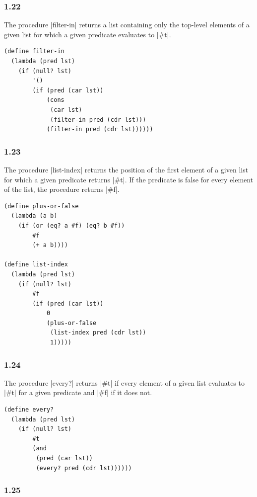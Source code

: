 \documentclass[a4paper]{article}
\begin{document}
\subsubsection*{1.22}

The procedure |filter-in| returns a list containing only the top-level elements of a given list for which a given predicate evaluates to |#t|.

\begin{lstlisting}
(define filter-in
  (lambda (pred lst)
    (if (null? lst)
        '()
        (if (pred (car lst))
            (cons
             (car lst)
             (filter-in pred (cdr lst)))
            (filter-in pred (cdr lst))))))
\end{lstlisting}

\subsubsection*{1.23}

The procedure |list-index| returns the position of the first element of a given list for which a given predicate returns |#t|. If the predicate is false for every element of the list, the procedure returns |#f|.

\begin{lstlisting}
(define plus-or-false
  (lambda (a b)
    (if (or (eq? a #f) (eq? b #f))
        #f
        (+ a b))))

(define list-index
  (lambda (pred lst)
    (if (null? lst)
        #f
        (if (pred (car lst))
            0
            (plus-or-false
             (list-index pred (cdr lst))
             1)))))
\end{lstlisting}

\subsubsection*{1.24}

The procedure |every?| returns |#t| if every element of a given list evaluates to |#t| for a given predicate and |#f| if it does not.

\begin{lstlisting}
(define every?
  (lambda (pred lst)
    (if (null? lst)
        #t
        (and
         (pred (car lst))
         (every? pred (cdr lst))))))
\end{lstlisting}

\subsubsection*{1.25}
\end{document}
